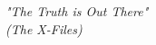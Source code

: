 \begin{epigrafe}
    \vspace*{\fill}
	\begin{flushright}

		\textit{"The Truth is Out There"\\
		(The X-Files)}
	\end{flushright}
\end{epigrafe}

